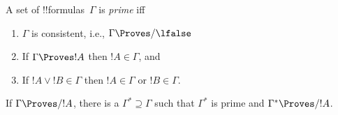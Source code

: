 \documentclass[../../../include/open-logic-section]{subfiles}
\begin{document}


\begin{defn}
  A set of !!{formula}s~$\Gamma$ is \emph{prime} iff 
  \begin{enumerate}
  \item{} $\Gamma$ is consistent, i.e., $\Gamma \Proves/ \lfalse$
  \item{} If $\Gamma \Proves !A$ then $!A \in \Gamma$, and
  \item{} If $!A \lor !B \in \Gamma$ then $!A \in
    \Gamma$ or $!B \in \Gamma$.
  \end{enumerate}
\end{defn}

\begin{lem}
   If $\Gamma \Proves/ !A$, there is a
  $\Gamma^* \supseteq \Gamma$ such that $\Gamma^*$ is prime and
  $\Gamma^* \Proves/ !A$.
\end{lem}
\end{document}
